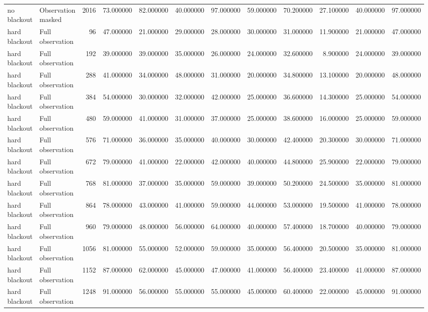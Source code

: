 \begin{tabular}{llrrrrrrrrrr}
no blackout & Observation masked & 2016 & 73.000000 & 82.000000 & 40.000000 & 97.000000 & 59.000000 & 70.200000 & 27.100000 & 40.000000 & 97.000000 \\
hard blackout & Full observation & 96 & 47.000000 & 21.000000 & 29.000000 & 28.000000 & 30.000000 & 31.000000 & 11.900000 & 21.000000 & 47.000000 \\
hard blackout & Full observation & 192 & 39.000000 & 39.000000 & 35.000000 & 26.000000 & 24.000000 & 32.600000 & 8.900000 & 24.000000 & 39.000000 \\
hard blackout & Full observation & 288 & 41.000000 & 34.000000 & 48.000000 & 31.000000 & 20.000000 & 34.800000 & 13.100000 & 20.000000 & 48.000000 \\
hard blackout & Full observation & 384 & 54.000000 & 30.000000 & 32.000000 & 42.000000 & 25.000000 & 36.600000 & 14.300000 & 25.000000 & 54.000000 \\
hard blackout & Full observation & 480 & 59.000000 & 41.000000 & 31.000000 & 37.000000 & 25.000000 & 38.600000 & 16.000000 & 25.000000 & 59.000000 \\
hard blackout & Full observation & 576 & 71.000000 & 36.000000 & 35.000000 & 40.000000 & 30.000000 & 42.400000 & 20.300000 & 30.000000 & 71.000000 \\
hard blackout & Full observation & 672 & 79.000000 & 41.000000 & 22.000000 & 42.000000 & 40.000000 & 44.800000 & 25.900000 & 22.000000 & 79.000000 \\
hard blackout & Full observation & 768 & 81.000000 & 37.000000 & 35.000000 & 59.000000 & 39.000000 & 50.200000 & 24.500000 & 35.000000 & 81.000000 \\
hard blackout & Full observation & 864 & 78.000000 & 43.000000 & 41.000000 & 59.000000 & 44.000000 & 53.000000 & 19.500000 & 41.000000 & 78.000000 \\
hard blackout & Full observation & 960 & 79.000000 & 48.000000 & 56.000000 & 64.000000 & 40.000000 & 57.400000 & 18.700000 & 40.000000 & 79.000000 \\
hard blackout & Full observation & 1056 & 81.000000 & 55.000000 & 52.000000 & 59.000000 & 35.000000 & 56.400000 & 20.500000 & 35.000000 & 81.000000 \\
hard blackout & Full observation & 1152 & 87.000000 & 62.000000 & 45.000000 & 47.000000 & 41.000000 & 56.400000 & 23.400000 & 41.000000 & 87.000000 \\
hard blackout & Full observation & 1248 & 91.000000 & 56.000000 & 55.000000 & 55.000000 & 45.000000 & 60.400000 & 22.000000 & 45.000000 & 91.000000 \\

\end{tabular}
